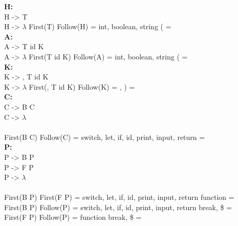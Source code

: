 \documentclass{article}[a4paper]
\newcommand\tab[1][1cm]{\hspace*{#1}}
\begin{document}
\textbf{H:}\\
\tab H -> T \\ \tab H -> $\lambda$
\tab \tab First(T) \cap  Follow(H) = \lbrace int, boolean, string \rbrace \cap \lbrace ( \rbrace = \emptyset \\

\textbf{A:}\\
\tab A -> T id K \\ \tab A -> $\lambda$
\tab \tab First(T id K) \cap  Follow(A) = \lbrace int, boolean, string \rbrace \cap \lbrace ( \rbrace = \emptyset \\

\textbf{K:}\\
\tab K -> , T id K \\ \tab K -> $\lambda$
\tab \tab First(, T id K) \cap  Follow(K) = \lbrace , \rbrace \cap \lbrace ) \rbrace = \emptyset \\

\textbf{C:}\\
\tab C -> B C \\ \tab C -> $\lambda$ \\ \\
\tab \tab First(B C) \cap  Follow(C) = \lbrace switch, let, if, id, print, input, return \rbrace \cap \lbrace \rbrace \rbrace = \emptyset \\

\textbf{P:}\\
\tab P -> B P \\ \tab P -> F P \\ \tab P -> $\lambda$ \\ \\
\tab \tab First(B P) \cap First(F P) = \lbrace switch, let, if, id, print, input, return \rbrace \cap \lbrace function \rbrace  = \emptyset \\
\tab \tab First(B P) \cap Follow(P) = \lbrace switch, let, if, id, print, input, return \rbrace \cap \lbrace break, \$ \rbrace = \emptyset \\
\tab \tab First(F P) \cap Follow(P) = \lbrace function \rbrace \cap \lbrace break, \$ \rbrace = \emptyset \\
\end{document}
